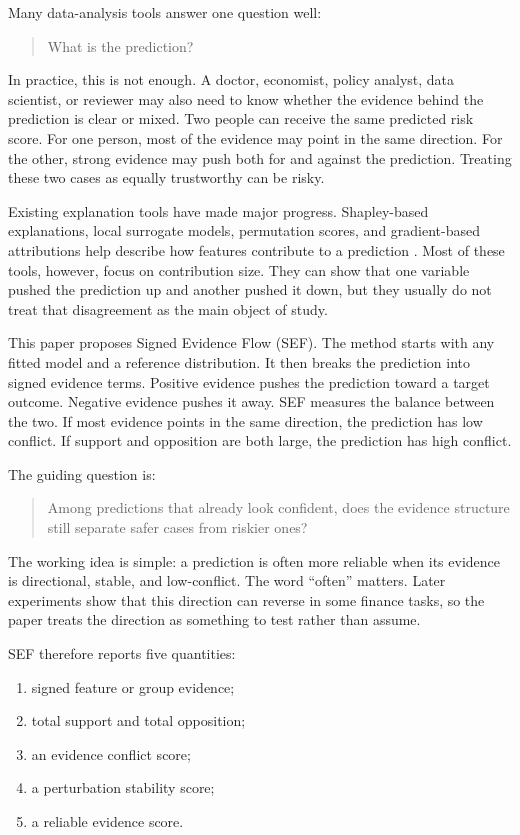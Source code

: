 \documentclass[11pt]{article}
\begin{document}
Many data-analysis tools answer one question well:

\begin{quote}
What is the prediction?
\end{quote}

In practice, this is not enough. A doctor, economist, policy analyst, data scientist, or reviewer may also need to know whether the evidence behind the prediction is clear or mixed. Two people can receive the same predicted risk score. For one person, most of the evidence may point in the same direction. For the other, strong evidence may push both for and against the prediction. Treating these two cases as equally trustworthy can be risky.

Existing explanation tools have made major progress. Shapley-based explanations, local surrogate models, permutation scores, and gradient-based attributions help describe how features contribute to a prediction \citep{shapley1953value,lundberg2017unified,ribeiro2016why,sundararajan2017axiomatic}. Most of these tools, however, focus on contribution size. They can show that one variable pushed the prediction up and another pushed it down, but they usually do not treat that disagreement as the main object of study.

This paper proposes Signed Evidence Flow (SEF). The method starts with any fitted model and a reference distribution. It then breaks the prediction into signed evidence terms. Positive evidence pushes the prediction toward a target outcome. Negative evidence pushes it away. SEF measures the balance between the two. If most evidence points in the same direction, the prediction has low conflict. If support and opposition are both large, the prediction has high conflict.

The guiding question is:

\begin{quote}
Among predictions that already look confident, does the evidence structure still separate safer cases from riskier ones?
\end{quote}

The working idea is simple: a prediction is often more reliable when its evidence is directional, stable, and low-conflict. The word ``often'' matters. Later experiments show that this direction can reverse in some finance tasks, so the paper treats the direction as something to test rather than assume.

SEF therefore reports five quantities:

\begin{enumerate}
\item signed feature or group evidence;
\item total support and total opposition;
\item an evidence conflict score;
\item a perturbation stability score;
\item a reliable evidence score.
\end{enumerate}
\end{document}
